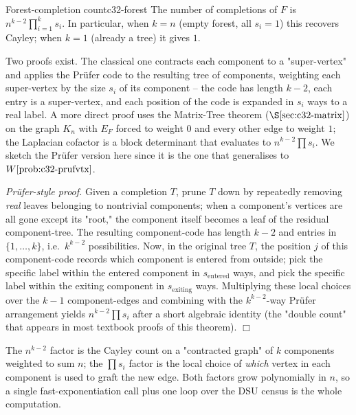 \begin{theorem}{Forest-completion count}{c32-forest}
The number of completions of \(F\) is \(n^{k-2}\prod_{i=1}^{k} s_i\).  In
particular, when \(k=n\) (empty forest, all \(s_i=1\)) this recovers Cayley;
when \(k=1\) (already a tree) it gives \(1\).
\end{theorem}

\begin{proofbox}
Two proofs exist.  The classical one contracts each component to a
"super-vertex" and applies the Pr\"ufer code to the resulting tree of
components, weighting each super-vertex by the size \(s_i\) of its
component -- the code has length \(k-2\), each entry is a super-vertex, and
each position of the code is expanded in \(s_i\) ways to a real label.  A
more direct proof uses the Matrix-Tree theorem (\(\secref{c32-matrix}\)) on
the graph \(K_n\) with \(E_F\) forced to weight \(0\) and every other edge to
weight \(1\); the Laplacian cofactor is a block determinant that evaluates to
\(n^{k-2}\prod s_i\).  We sketch the Pr\"ufer version here since it is the
one that generalises to \(\probref{c32-prufvtx}\).

\emph{Pr\"ufer-style proof.}  Given a completion \(T\), prune \(T\) down by
repeatedly removing \emph{real} leaves belonging to nontrivial components;
when a component's vertices are all gone except its "root," the component
itself becomes a leaf of the residual component-tree.  The resulting
component-code has length \(k-2\) and entries in \(\{1,\dots,k\}\), i.e.\
\(k^{k-2}\) possibilities.  Now, in the original tree \(T\), the position
\(j\) of this component-code records which component is entered from outside;
pick the specific label within the entered component in \(s_{\text{entered}}\)
ways, and pick the specific label within the exiting component in
\(s_{\text{exiting}}\) ways.  Multiplying these local choices over the
\(k-1\) component-edges and combining with the \(k^{k-2}\)-way Pr\"ufer
arrangement yields \(n^{k-2}\prod s_i\) after a short algebraic identity
(the "double count" that appears in most textbook proofs of this theorem).
\(\Box\)
\end{proofbox}

\begin{insightbox}
The \(n^{k-2}\) factor is the Cayley count on a "contracted graph" of \(k\)
components weighted to sum \(n\); the \(\prod s_i\) factor is the local
choice of \emph{which} vertex in each component is used to graft the new
edge.  Both factors grow polynomially in \(n\), so a single fast-exponentiation
call plus one loop over the DSU census is the whole computation.
\end{insightbox}

